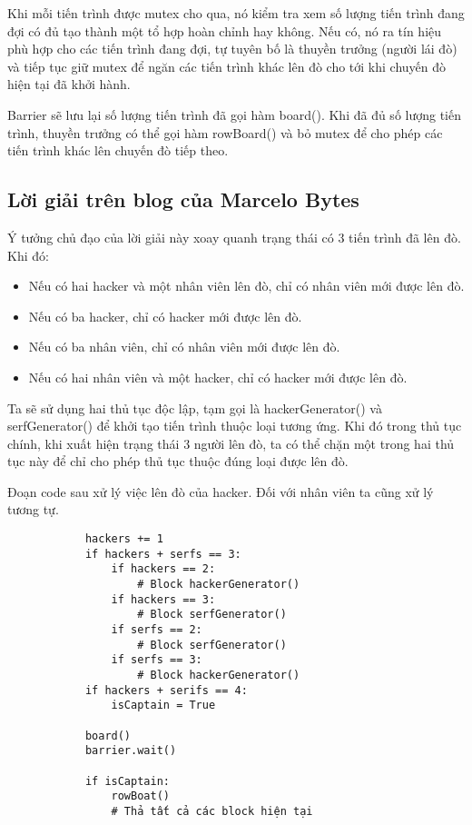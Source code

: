 \documentclass[a4paper]{article}
\begin{document}
	Khi mỗi tiến trình được mutex cho qua, nó kiểm tra xem số lượng tiến
	trình đang đợi có đủ tạo thành một tổ hợp hoàn chỉnh hay không. Nếu có, 
	nó ra tín hiệu phù hợp cho các tiến trình đang đợi, tự tuyên bố là 
	thuyền trưởng (người lái đò) và tiếp tục giữ mutex để ngăn các tiến trình
	khác lên đò cho tới khi chuyến đò hiện tại đã khởi hành.

	Barrier sẽ lưu lại số lượng tiến trình đã gọi hàm board(). Khi đã đủ số
	lượng tiến trình, thuyền trưởng có thể gọi hàm rowBoard() và bỏ mutex để
	cho phép các tiến trình khác lên chuyến đò tiếp theo.

	\subsection{Lời giải trên blog của Marcelo Bytes\cite{bytes}}
	Ý tưởng chủ đạo của lời giải này xoay quanh trạng thái có 3 tiến trình đã 
	lên đò. Khi đó:

	\begin{itemize}
		\item {Nếu có hai hacker và một nhân viên lên đò, chỉ có nhân viên mới được lên đò.}
		\item {Nếu có ba hacker, chỉ có hacker mới được lên đò.}
		\item {Nếu có ba nhân viên, chỉ có nhân viên mới được lên đò.}
		\item {Nếu có hai nhân viên và một hacker, chỉ có hacker mới được lên đò.}
	\end{itemize}

	Ta sẽ sử dụng hai thủ tục độc lập, tạm gọi là hackerGenerator() và 
	serfGenerator() để khởi tạo tiến trình thuộc loại tương ứng. Khi đó trong
	thủ tục chính, khi xuất hiện trạng thái 3 người lên đò, ta có thể chặn một
	trong hai thủ tục này để chỉ cho phép thủ tục thuộc đúng loại được lên đò.

	Đoạn code sau xử lý việc lên đò của hacker. Đối với nhân viên ta cũng xử lý tương tự.

	\begin{tcolorbox}
		\begin{verbatim}
			hackers += 1
			if hackers + serfs == 3: 
			    if hackers == 2:
			        # Block hackerGenerator()
			    if hackers == 3:
			        # Block serfGenerator()
			    if serfs == 2:
			        # Block serfGenerator()
			    if serfs == 3:
					# Block hackerGenerator()
			if hackers + serifs == 4:
			    isCaptain = True
			
			board() 
			barrier.wait() 
			
			if isCaptain: 
			    rowBoat() 
			    # Thả tất cả các block hiện tại
		\end{verbatim}
	\end{tcolorbox}
\end{document}
